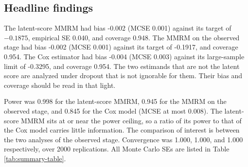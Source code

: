 \documentclass[
  11pt,
]{article}
\begin{document}
\subsection{Headline findings}\label{headline-findings}

The latent-score MMRM had bias -0.002 (MCSE
0.001) against its target of
\(-0.1875\), empirical SE 0.040, and
coverage 0.948. The MMRM on the
observed stage had bias -0.002 (MCSE
0.001) against its target of
-0.1917, and coverage
0.954. The Cox estimator had bias
-0.004 (MCSE 0.003)
against its large-sample limit of
-0.3295, and coverage
0.954. The two estimands that are not
the latent score are analyzed under dropout that is not
ignorable for them. Their bias and coverage should be read
in that light.

Power was 0.998 for the latent-score MMRM,
0.945 for the MMRM on the observed stage,
and 0.845 for the Cox model (MCSE at most
0.008). The latent-score
MMRM sits at or near the power ceiling, so a ratio of its
power to that of the Cox model carries little
information. The comparison of interest is between the two
analyses of the observed stage. Convergence was
1.000, 1.000,
and 1.000 respectively, over
2000 replications. All Monte Carlo SEs are listed in
Table \ref{tab:summary-table}.

\begin{table}[!h]
\centering
\caption{\label{tab:summary-table}Primary scenario: performance of the three analyses (2000 replications, 200 per arm). Bias and coverage are relative to the estimand values in Methods. Monte Carlo SEs per Morris et al. (2019) Table 6.}
\centering
{}
\end{table}
\end{document}
